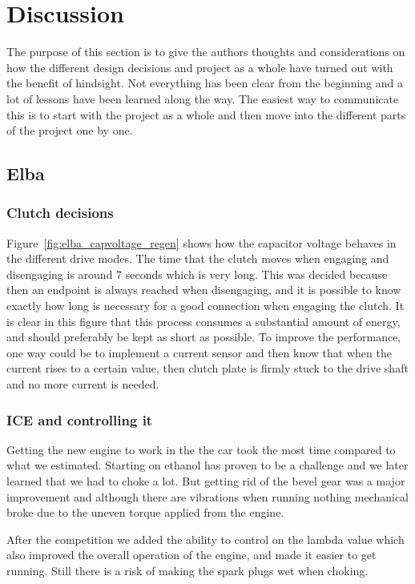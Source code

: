 \chapter{Discussion}
The purpose of this section is to give the authors thoughts and considerations
on how the different design decisions and project as a whole have turned out
with the benefit of hindsight. Not everything has been clear from the beginning
and a lot of lessons have been learned along the way. The easiest way to
communicate this is to start with the project as a whole and then move into the
different parts of the project one by one. 

\section{Elba}
\subsection{Clutch decisions}
Figure~\ref{fig:elba_capvoltage_regen} shows how the capacitor voltage behaves in the different drive modes.
The time that the clutch moves when engaging and disengaging is around 7 seconds which is very long. This was decided because then an endpoint is always reached when disengaging, and it is possible to know exactly how long is necessary 
for a good connection when engaging the clutch. It is clear in this figure that this process consumes a substantial 
amount of energy, and should preferably be kept as short as possible. To improve the performance, one way could be to implement a current sensor and then know that when the current rises to a certain value, then clutch plate is firmly stuck to the drive shaft and no more current is needed.

\subsection{ICE and controlling it}
Getting the new engine to work in the the car took the most time compared to what we estimated. Starting on ethanol has proven to be a challenge and we later learned that we had to choke a lot. But getting rid of the bevel gear was a major improvement and although there are vibrations when running nothing mechanical broke due to the uneven torque applied from the engine. 

After the competition we added the ability to control on the lambda value which also improved the overall operation of the engine, and made it easier to get running. Still there is a risk of making the spark plugs wet when choking. 


